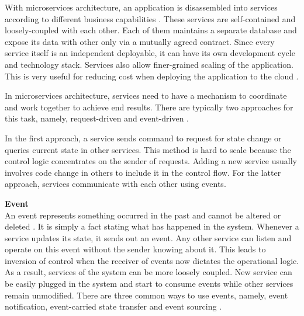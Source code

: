 With microservices architecture, an application is disassembled into services according to different business capabilities \cite{microservicesfowler}. These services are self-contained and loosely-coupled with each other. Each of them maintains a separate database and expose its data with other only via a mutually agreed contract. Since every service itself is an independent deployable, it can have its own development cycle and technology stack. Services also allow finer-grained scaling of the application. This is very useful for reducing cost when deploying the application to the cloud \cite{villamizar2016infrastructure}.

In microservices architecture, services need to have a mechanism to coordinate and work together to achieve end results. There are typically two approaches for this task, namely, request-driven and event-driven \cite{stopford2018designingeventdriven}.

In the first approach, a service sends command to request for state change or queries current state in other services. This method is hard to scale because the control logic concentrates on the sender of requests. Adding a new service usually involves code change in others to include it in the control flow. For the latter approach, services communicate with each other using events.

\textbf{Event}\\
An event represents something occurred in the past and cannot be altered or deleted \cite{cqrsgregyoung}. It is simply a fact stating what has happened in the system. Whenever a service updates its state, it sends out an event. Any other service can listen and operate on this event without the sender knowing about it. This leads to inversion of control when the receiver of events now dictates the operational logic. As a result, services of the system can be more loosely coupled. New service can be easily plugged in the system and start to consume events while other services remain unmodified. There are three common ways to use events, namely, event notification, event-carried state transfer and event sourcing \cite{martinfowlereventdriven}.

